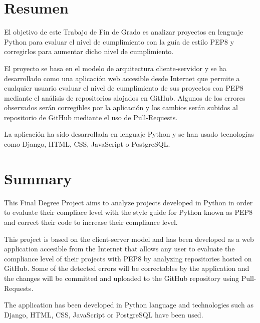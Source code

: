 \documentclass[a4paper, 12pt]{book}
\begin{document}
\chapter*{Resumen}

El objetivo de este Trabajo de Fin de Grado es analizar proyectos en lenguaje Python para evaluar el nivel de cumplimiento con la guía de estilo PEP8 y corregirlos para aumentar dicho nivel de cumplimiento.

El proyecto se basa en el modelo de arquitectura cliente-servidor y se ha desarrollado como una aplicación web accesible desde Internet que permite a cualquier usuario evaluar el nivel de cumplimiento de sus proyectos con PEP8 mediante el análisis de repositorios alojados en GitHub.
Algunos de los errores observados serán corregibles por la aplicación y los cambios serán subidos al repositorio de GitHub mediante el uso de Pull-Requests.

La aplicación ha sido desarrollada en lenguaje Python y se han usado tecnologías como Django, HTML, CSS, JavaScript o PostgreSQL.


\chapter*{Summary}
This Final Degree Project aims to analyze projects developed in Python in order to evaluate their compliace level with the style guide for Python known as PEP8 and correct their code to increase their compliance level.

This project is based on the client-server model and has been developed as a web application accesible from the Internet that allows any user to evaluate the compliance level of their projects with PEP8 by analyzing repositories hosted on GitHub.
Some of the detected errors will be correctables by the application and the changes will be committed and uploaded to the GitHub repository using Pull-Requests.

The application has been developed in Python language and technologies such as Django, HTML, CSS, JavaScript or PostgreSQL have been used.

\end{document}
